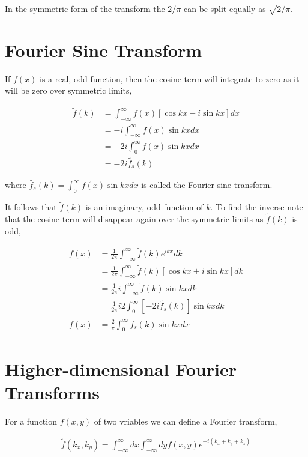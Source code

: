\documentclass[11pt]{amsart}
\begin{document}
In the symmetric form of the transform the $2/\pi$ can be split equally as $\sqrt{2/\pi}$.

\section{Fourier Sine Transform}

If $f(x)$ is a real, odd function, then the cosine term will integrate to zero as it will be zero over symmetric limits,

\begin{align*}
  \tilde{f}(k) &= \int_{-\infty}^{\infty} f(x) \left[\cos{kx} - i\sin{kx}\right] dx \\
               &= -i\int_{-\infty}^{\infty} f(x) \sin{kx} dx \\
               &= -2i\int_0^{\infty} f(x) \sin{kx} dx \\
               &= -2i \tilde{f_s}(k)
\end{align*}

where $\tilde{f_s}(k) = \int_0^{\infty}f(x)\sin{kx}dx$ is called the Fourier sine transform.

It follows that $\tilde{f}(k)$ is an imaginary, odd function of $k$. To find the inverse note that the cosine term will disappear again over the symmetric limits as $\tilde{f}(k)$ is odd,

\begin{align*}
  f(x) &= \frac{1}{2\pi}\int_{-\infty}^{\infty} \tilde{f}(k) e^{ikx} dk \\
       &= \frac{1}{2\pi}\int_{-\infty}^{\infty} \tilde{f}(k) \left[\cos{kx} + i\sin{kx}\right] dk \\
       &= \frac{1}{2\pi} i \int_{-\infty}^{\infty} \tilde{f}(k) \sin{kx} dk \\
       &= \frac{1}{2\pi} i 2 \int_0^{\infty}\left[-2i\tilde{f_s}(k)\right] \sin{kx} dk \\
  f(x) &= \frac{2}{\pi} \int_0^{\infty}\tilde{f_s}(k)\sin{kx} dx
\end{align*}

\section{Higher-dimensional Fourier Transforms}

For a function $f(x, y)$ of two vriables we can define a Fourier transform,

\begin{align*}
  \tilde{f}(k_x, k_y) = \int_{-\infty}^{\infty}dx\int_{-\infty}^{\infty}dy f(x, y) e^{-i(k_x+k_y+k_z)}
\end{align*}
\end{document}
